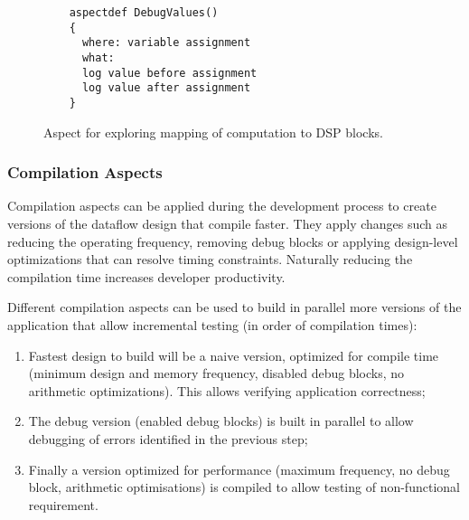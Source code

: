 \lstset{style=lara}
\begin{figure}[!h]
  \centering
  \begin{lstlisting}
    aspectdef DebugValues()
    {
      where: variable assignment
      what:
      log value before assignment
      log value after assignment
    }
  \end{lstlisting}
  \caption{Aspect for exploring mapping of computation to DSP blocks.}
  \label{fig:aspect-DSP}
\end{figure}

\subsubsection{Compilation Aspects}

Compilation aspects can be applied during the development process to
create versions of the dataflow design that compile faster. They apply
changes such as reducing the operating frequency, removing debug
blocks or applying design-level optimizations that can resolve timing
constraints. Naturally reducing the compilation time increases
developer productivity.

Different compilation aspects can be used to build in parallel more
versions of the application that allow incremental testing (in order
of compilation times):
\begin{enumerate}
\item Fastest design to build will be a naive version, optimized for
  compile time (minimum design and memory frequency, disabled debug
  blocks, no arithmetic optimizations). This allows verifying
  application correctness;
\item The debug version (enabled debug blocks) is built in parallel to
  allow debugging of errors identified in the previous step;
\item Finally a version optimized for performance (maximum frequency,
  no debug block, arithmetic optimisations) is compiled to allow
  testing of non-functional requirement.
\end{enumerate}
